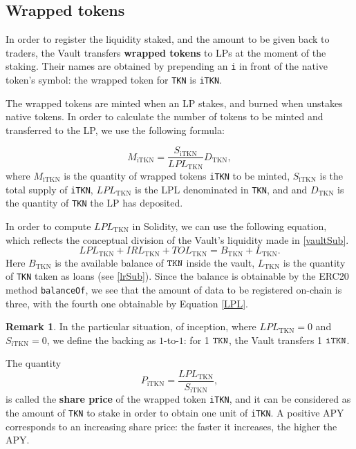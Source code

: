 \documentclass[a4paper,10 pt]{article}
\theoremstyle{definition}
\newtheorem{remark}{Remark}
\begin{document}
\subsection{Wrapped tokens}\label{wtSub}

In order to register the liquidity staked, and the amount to be given back to traders, the Vault transfers {\bf wrapped tokens} to LPs at the moment of the staking.
Their names are obtained by prepending an \verb|i| in front of the native token's symbol: the wrapped token for \verb|TKN| is \verb|iTKN|.

The wrapped tokens are minted when an LP stakes, and burned when unstakes native tokens. In order to calculate the number of tokens to be minted and transferred to the LP, we use the following formula:

\begin{equation}\label{wrappedtokens}
M_{\text{iTKN}} = \frac{S_{\text{iTKN}}}{LPL_{\text{TKN}}}D_{\text{TKN}},
\end{equation}
where $M_{\text{iTKN}}$ is the quantity of wrapped tokens \verb|iTKN| to be minted, $S_{\text{iTKN}}$ is the total supply of \verb|iTKN|, $LPL_{\text{TKN}}$ is the LPL denominated in \verb|TKN|, and  and $D_\text{TKN}$ is the quantity of \verb|TKN| the LP has deposited. 

In order to compute $LPL_{\text{TKN}}$ in Solidity, we can use the following equation, which reflects the conceptual division of the Vault's liquidity made in \ref{vaultSub}.
\begin{equation}\label{LPL}
LPL_\text{TKN} + IRL_{\text{TKN}} + TOL_{\text{TKN}} = B_{\text{TKN}} + L_{\text{TKN}}.
\end{equation}
Here $B_{\text{TKN}}$ is the available balance of $\verb|TKN|$ inside the vault, $L_{\text{TKN}}$ is the quantity of \verb|TKN| taken as loans (see \ref{lrSub}). Since the balance is obtainable by the ERC20 method \verb|balanceOf|, we see that the amount of data to be registered on-chain is three, with the fourth one obtainable by Equation \eqref{LPL}.

\begin{remark}
In the particular situation, of inception, where $LPL_{\text{TKN}} = 0$ and $S_{\text{iTKN}} = 0$, we define the backing as $1$-to-$1$: for 1 $\verb|TKN|$, the Vault transfers 1 $\verb|iTKN|$.
\end{remark}

The quantity 
\begin{equation}\label{shareprice}
P_{\text{iTKN}} = \frac{LPL_{\text{TKN}}}{S_{\text{iTKN}}},
\end{equation} 
is called the {\bf share price} of the wrapped token \verb|iTKN|, and it can be considered as the amount of \verb|TKN| to stake in order to obtain one unit of \verb|iTKN|. A positive APY corresponds to an increasing share price: the faster it increases, the higher the APY.
\end{document}
